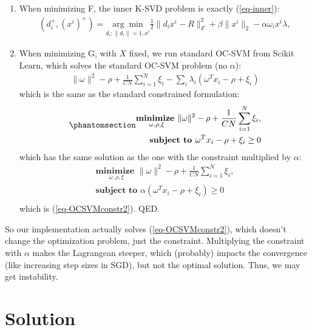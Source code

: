 \documentclass[
  letterpaper,
  DIV=11,
  numbers=noendperiod]{scrartcl}
\begin{document}
\begin{enumerate}
\def\labelenumi{\arabic{enumi}.}
\item
  When minimizing F, the inner K-SVD problem is exactly
  (\ref{eq-inner}): \[
    \begin{align}
    (d^+_i,(x^i)^+) = \underset{d_i: \|d_i\|=1,x^i}{\arg\min} \frac12\|d_ix^i - R\|_F^2  + \beta\|x^i\|_2 - \alpha \omega_i x^i\lambda ,
    \end{align}
    \]
\item
  When minimizing G, with \(X\) fixed, we run standard OC-SVM from
  Scikit Learn, which solves the standard OC-SVM problem (no
  \(\alpha\)): \[
    \begin{align}
    \|\omega\|^2 - \rho + \frac{1}{CN} \sum_{i=1}^{N} \xi_i - \sum_i \lambda_i \left(\omega^T x_i - \rho + \xi_i \right)
    \end{align}
    \] which is the same as the standard constrained formulation:
  \begin{equation}\phantomsection\label{eq-OCSVMconstr-standard}{
    \begin{align}
    \underset{\omega, \rho, \xi}{\textbf{minimize  }} \|\omega\|^2 - \rho + \frac{1}{CN} \sum_{i=1}^{N} \xi_i, \\
    \textbf{subject to  } \omega^T x_i - \rho + \xi_i \geq 0\\
    \end{align}
    }\end{equation} which has the same solution as the one with the
  constraint multiplied by \(\alpha\): \[
    \begin{align}
    \underset{\omega, \rho, \xi}{\textbf{minimize  }} \|\omega\|^2 - \rho + \frac{1}{CN} \sum_{i=1}^{N} \xi_i, \\
    \textbf{subject to  } \alpha \left( \omega^T x_i - \rho + \xi_i \right) \geq 0\\
    \end{align}
    \] which is (\ref{eq-OCSVMconstr2}). QED.
\end{enumerate}

So our implementation actually solves (\ref{eq-OCSVMconstr2}), which
doesn't change the optimization problem, just the constraint.
Multiplying the constraint with \(\alpha\) makes the Lagrangean steeper,
which (probably) impacts the convergence (like increasing step sizes in
SGD), but not the optimal solution. Thus, we may get instability.

\section{Solution}\label{solution}
\end{document}
